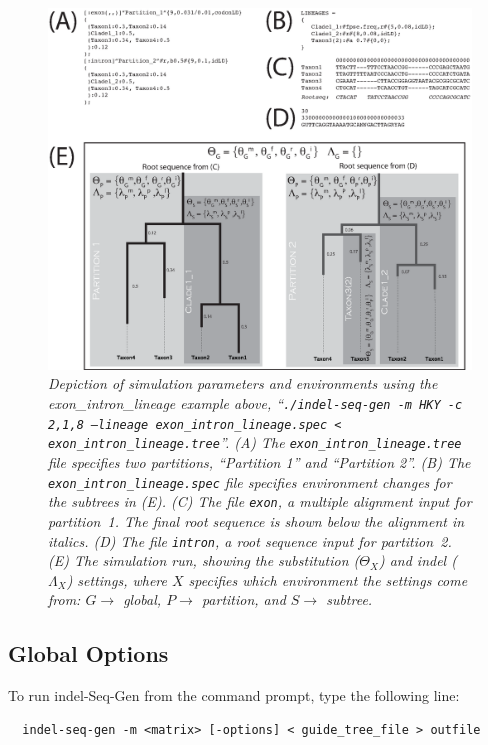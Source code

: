\documentclass[10pt]{article}
\begin{document}
\begin{figure}
\includegraphics[width=\textwidth]{fig/general_simulation}
\caption{\textit{Depiction of simulation parameters and environments using the exon\_intron\_lineage example above, ``\texttt{./indel-seq-gen -m HKY -c 2,1,8 --lineage exon\_intron\_lineage.spec < exon\_intron\_lineage.tree}''. (A) The \texttt{exon\_intron\_lineage.tree} file specifies two partitions, ``Partition 1'' and ``Partition 2''. (B) The \texttt{exon\_intron\_lineage.spec} file specifies environment changes for the subtrees in (E). (C) The file \texttt{exon}, a multiple alignment input for partition~1. The final root sequence is shown below the alignment in italics. (D) The file \texttt{intron}, a root sequence input for partition~2. (E) The simulation run, showing the substitution ($\Theta_X$) and indel ($\Lambda_X$) settings, where $X$ specifies which environment the settings come from: $G\rightarrow$ global, $P\rightarrow$ partition, and $S\rightarrow$ subtree.}}
\label{fig:simulation_run}
\end{figure}


\subsection{Global Options}
\label{sec:global_options}
 To run indel-Seq-Gen from the command prompt, type the following line:

  \begin{verbatim}
  indel-seq-gen -m <matrix> [-options] < guide_tree_file > outfile
  \end{verbatim}
\end{document}
